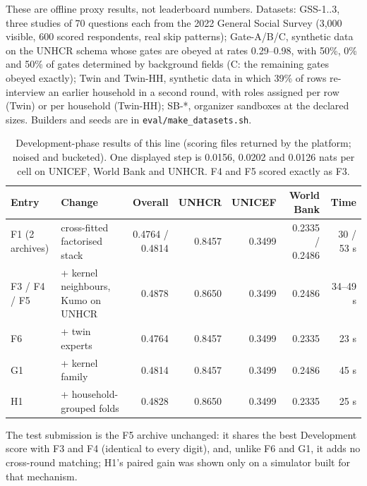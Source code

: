 These are offline proxy results, not leaderboard numbers. Datasets: GSS-1..3, three studies of 70 questions each from the 2022 General Social Survey (3,000 visible, 600 scored respondents, real skip patterns); Gate-A/B/C, synthetic data on the UNHCR schema whose gates are obeyed at rates 0.29--0.98, with 50\%, 0\% and 50\% of gates determined by background fields (C: the remaining gates obeyed exactly); Twin and Twin-HH, synthetic data in which 39\% of rows re-interview an earlier household in a second round, with roles assigned per row (Twin) or per household (Twin-HH); SB-*, organizer sandboxes at the declared sizes. Builders and seeds are in \texttt{eval/make\_datasets.sh}.





\begin{table}[h]
\centering\small
\caption{Development-phase results of this line (scoring files returned by the platform; noised and bucketed). One displayed step is 0.0156, 0.0202 and 0.0126 nats per cell on UNICEF, World Bank and UNHCR. F4 and F5 scored exactly as F3.}
\label{tab:devhist}
\begin{tabular}{llrrrrr}
\toprule
Entry & Change & Overall & UNHCR & UNICEF & World Bank & Time \\
\midrule
F1 (2 archives) & cross-fitted factorised stack & 0.4764 / 0.4814 & 0.8457 & 0.3499 & 0.2335 / 0.2486 & 30 / 53 s \\
F3 / F4 / F5 & + kernel neighbours, Kumo on UNHCR & 0.4878 & 0.8650 & 0.3499 & 0.2486 & 34--49 s \\
F6 & + twin experts & 0.4764 & 0.8457 & 0.3499 & 0.2335 & 23 s \\
G1 & + kernel family & 0.4814 & 0.8457 & 0.3499 & 0.2486 & 45 s \\
H1 & + household-grouped folds & 0.4828 & 0.8650 & 0.3499 & 0.2335 & 25 s \\
\bottomrule
\end{tabular}
\end{table}

The test submission is the F5 archive unchanged: it shares the best Development score with F3 and F4 (identical to every digit), and, unlike F6 and G1, it adds no cross-round matching; H1's paired gain was shown only on a simulator built for that mechanism.


